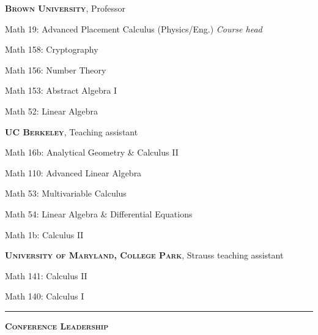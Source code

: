 \documentclass[12pt]{article}
\newcommand{\sectionheading}[1]
	{\bigskip %
	\noindent
	\hspace{-6.5mm}\textcolor{Gray}{\rule[.75mm]{21.5mm}{1mm}} %
	\hspace{.2mm}	%
	{\large{\textbf{\textsc{#1}}}} %
}
\newenvironment{date_section}
	{
	\vspace{-1ex}
	\leftmargini = 15ex
	 \begin{itemize}[
		 labelsep = *,
		 labelwidth = 9ex,
		 labelindent = 0ex,
		 itemindent = !,
		 font=\normalfont, 
		 align=parleft
		 ]
		{}
		\itemsep=-1.5mm}
	{\end{itemize}\vspace{-2ex}}
\newcommand{\yearmo}[2]{
	\item[ 
		{\makebox[1ex][r]{#1}}
		\hspace{1ex}
		{\makebox[1ex][l]{#2} }
		] }
\begin{document}
\begin{date_section}
			\yearmo{}{}\textbf{\textsc{Brown University}}, Professor
			\yearmo{}{2013}%
				Math \phantom{0}19: Advanced Placement Calculus (Physics/Eng.)
				\textit{Course head}
			\yearmo{}{}%
				Math 158: Cryptography
			\yearmo{}{}%
				Math 156: Number Theory
			\yearmo{}{2011}%
				Math 153: Abstract Algebra I
			\yearmo{}{}%
				Math \phantom{0}52: Linear Algebra
			\yearmo{}{}\textbf{\textsc{UC Berkeley}}, Teaching assistant
			\yearmo{}{2008}%
				Math 16b: Analytical Geometry \& Calculus II
			\yearmo{}{2007}%
				Math 110: Advanced Linear Algebra
			\yearmo{}{2006}%
				Math \phantom{0}53: Multivariable Calculus
			\yearmo{}{}%
				Math \phantom{0}54: Linear Algebra \& Differential Equations
			\yearmo{}{2005}%
				Math \phantom{0}1b: Calculus II
			\yearmo{}{}\textbf{\textsc{University of Maryland, College Park}}, Strauss teaching assistant
			\yearmo{}{2005}%
				Math 141: Calculus II
			\yearmo{}{2004}%
				Math 140: Calculus I
	
		\end{date_section}
	
		
		\sectionheading{Conference Leadership}%
	
\end{document}
